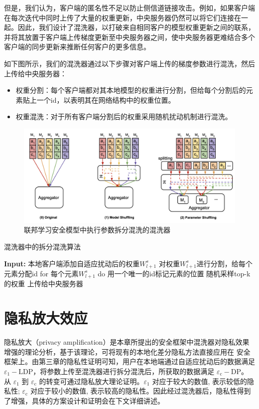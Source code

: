 但是，我们认为，客户端的匿名性不足以防止侧信道链接攻击。例如，如果客户端在每次迭代中同时上传了大量的权重更新，中央服务器仍然可以将它们连接在一起。因此，我们设计了混洗器，以打破来自相同客户的模型权重更新之间的联系，并将其放置于客户端上传梯度更新至中央服务器之间，使中央服务器更难结合多个客户端的同步更新来推断任何客户的更多信息。

如下图所示，我们的混洗器通过以下步骤对客户端上传的梯度参数进行混洗，然后上传给中央服务器：
\begin{itemize}
	\item 权重分割：每个客户端都对其本地模型的权重进行分割，但给每个分割后的元素贴上一个id，以表明其在网络结构中的权重位置。
	\item 权重混洗：对于所有客户端分割后的权重采用随机扰动机制进行混洗。
\end{itemize}

\begin{figure}[!hbt]
\centering
	\includegraphics[scale=0.4]{fig2/C4/混洗器}%
	\caption{联邦学习安全模型中执行参数拆分混洗的混洗器}
	\label{fig:联邦学习安全模型中执行参数拆分混洗的混洗器}	
\end{figure}

\begin{algorithm}[!htb]
	\caption{混洗器中的拆分混洗算法}
	\label{混洗器中的拆分混洗算法}
	\begin{algorithmic}[1]
		\footnotesize
		\STATE \textbf{Input:} 本地客户端添加自适应扰动后的权重$W_{l+1}^{s}$
	    \STATE 对权重$W_{l+1}^{s}$进行分割，给每个元素分配id
	    \STATE for 每个元素$W_{l+1}^{s}$ do
	    \STATE 用一个唯一的id标记元素的位置
	    \STATE 随机采样top-k的权重
	    \STATE 上传给中央服务器
	\end{algorithmic}
\end{algorithm}

\section{隐私放大效应}
隐私放大（privacy amplification）是本章所提出的安全框架中混洗器对隐私效果增强的理论分析，基于该理论，可将现有的本地化差分隐私方法直接应用在 安全框架上。由第三章的隐私性证明可知，用户在本地端通过自适应扰动后的数据满足 $\varepsilon_{1}-\mathrm{LDP}$，将参数上传至混洗器进行拆分混洗后，所获取的数据满足 $\varepsilon_{\mathrm{c}}-\mathrm{DP}$。从 $\varepsilon_{1}$ 到 $\varepsilon_{\mathrm{c}}$ 的转变可通过隐私放大理论证明。$\varepsilon_{1}$ 对应于较大的数值, 表示较低的隐私性; $\varepsilon_{\mathrm{c}}$ 对应于较小的数值, 表示较高的隐私性。因此经过混洗器后，隐私性得到了增强，具体的方案设计和证明会在下文详细讲述。

